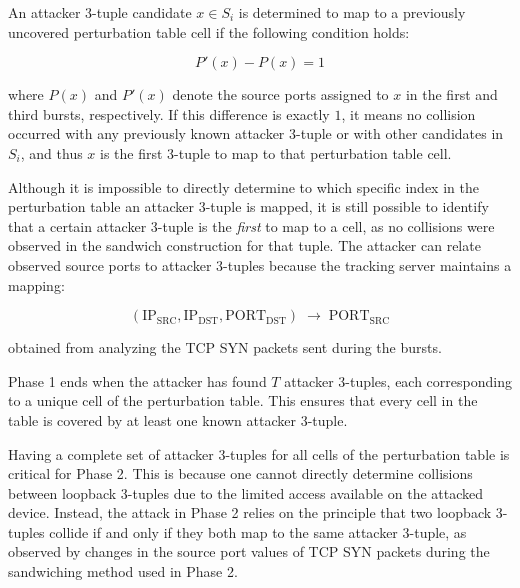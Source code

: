 \documentclass{report}
\begin{document}
An attacker 3-tuple candidate $x \in S_i$ is determined to map to a previously uncovered perturbation table cell if the following condition holds:

\[
	P'(x) - P(x) = 1
\]

where $P(x)$ and $P'(x)$ denote the source ports assigned to $x$ in the first and third bursts, respectively. If this difference is exactly $1$, it means no collision occurred with any previously known attacker 3-tuple or with other candidates in $S_i$, and thus $x$ is the first 3-tuple to map to that perturbation table cell.


Although it is impossible to directly determine to which specific index in the perturbation table an attacker 3-tuple is mapped, it is still possible to identify that a certain attacker 3-tuple is the \emph{first} to map to a cell, as no collisions were observed in the sandwich construction for that tuple. The attacker can relate observed source ports to attacker 3-tuples because the tracking server maintains a mapping:

\[
	(\mathrm{IP_{SRC}}, \mathrm{IP_{DST}}, \mathrm{PORT_{DST}}) \;\rightarrow\; \mathrm{PORT_{SRC}}
\]

obtained from analyzing the TCP SYN packets sent during the bursts.


Phase 1 ends when the attacker has found $T$ attacker 3-tuples, each corresponding to a unique cell of the perturbation table. This ensures that every cell in the table is covered by at least one known attacker 3-tuple.


Having a complete set of attacker 3-tuples for all cells of the perturbation table is critical for Phase 2. This is because one cannot directly determine collisions between loopback 3-tuples due to the limited access available on the attacked device. Instead, the attack in Phase 2 relies on the principle that two loopback 3-tuples collide if and only if they both map to the same attacker 3-tuple, as observed by changes in the source port values of TCP SYN packets during the sandwiching method used in Phase 2.
\end{document}

